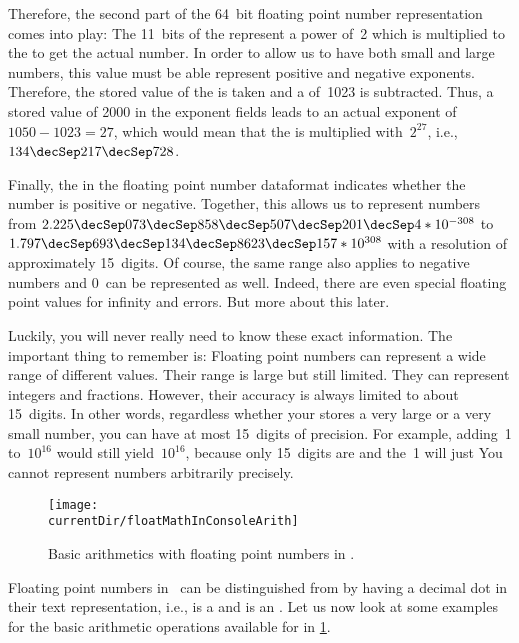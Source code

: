 Therefore, the second part of the 64~bit floating point number representation comes into play:
The 11~bits of the  represent a power of~2 which is multiplied to the  to get the actual number.
In order to allow us to have both small and large numbers, this value must be able represent positive and negative exponents.
Therefore, the stored value of the  is taken and a  of~1023 is subtracted.
Thus, a stored value of 2000 in the exponent fields leads to an actual exponent of $1050-1023=27$, which would mean that the  is multiplied with~$2^{27}$, i.e., $134\decSep217\decSep728$.%
%
\begin{sloppypar}%
Finally, the  in the floating point number dataformat indicates whether the number is positive or negative.
Together, this allows us to represent numbers from $2.225\decSep073\decSep858\decSep507\decSep201\decSep4*10^{-308}$ to $1.797\decSep693\decSep134\decSep8623\decSep157*10^{308}$ with a resolution of approximately 15~digits.
Of course, the same range also applies to negative numbers and $0$~can be represented as well.
Indeed, there are even special floating point values for infinity and errors.
But more about this later.%
\end{sloppypar}%
%
Luckily, you will never really need to know these exact information.
The important thing to remember is:
Floating point numbers can represent a wide range of different values.
Their range is large but still limited.
They can represent integers and fractions.
However, their accuracy is always limited to about 15~digits.
In other words, regardless whether your  stores a very large or a very small number, you can have at most 15~digits of precision.
For example, adding~1 to~$10^{16}$ would still yield~$10^{16}$, because only 15~digits are  and the~1 will just 
You cannot represent numbers arbitrarily precisely.%
%
\endhsection%
%
%
\label{sec:floatarith}%
%
\begin{figure}%
\centering%
\texttt{[image: \\currentDir/floatMathInConsoleArith]}%
\caption{Basic arithmetics with floating point numbers in \python.}%
\label{fig:floatMathInConsoleArith}%
\end{figure}%
%
Floating point numbers in \python\ can be distinguished from  by having a decimal dot in their text representation, i.e.,  is a  and  is an .
Let us now look at some examples for the basic arithmetic operations available for  in \cref{fig:floatMathInConsoleArith}.

